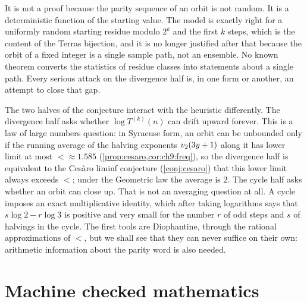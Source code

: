 It is not a proof because the parity sequence of an orbit is not random. It is
a deterministic function of the starting value. The model is exactly right
for a uniformly random starting residue modulo $2^k$ and the first $k$ steps,
which is the content of the Terras bijection, and it is no longer justified after that
because the orbit of a fixed integer is a single sample path, not an ensemble.
No known theorem converts the statistics of residue classes into statements
about a single path.
Every serious attack on the divergence half is, in one form or another, an attempt to close that gap.

The two halves of the conjecture interact with the heuristic differently. The
divergence half asks whether $\log T^{(k)}(n)$ can drift upward forever.
This is a law of large numbers question: in Syracuse form, an orbit can be unbounded only if the running average of the halving exponents $v_2(3y+1)$ along it has lower limit at most $\lt\approx1.585$ (\cref{prop:cesaro,cor:ch9:freq}), so the divergence half is equivalent to the Ces\`aro liminf conjecture (\cref{conj:cesaro}) that this lower limit always exceeds $\lt$; under the Geometric law the average is $2$.
The cycle half asks whether an orbit can close up. That is not an
averaging question at all. A cycle imposes an exact multiplicative identity,
which after taking logarithms says that $s\log2-r\log3$ is positive and very
small for the number $r$ of odd steps and $s$ of halvings in the cycle. The
first tools are Diophantine, through the rational approximations of $\lt$,
but we shall see that they can never suffice on their own: arithmetic
information about the parity word is also needed.

\section{Machine checked mathematics}\label{sec:ch1:lean}

